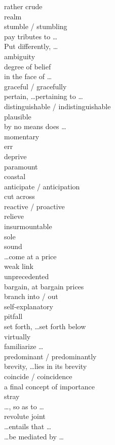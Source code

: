 \documentclass[12pt]{article}
\begin{document}
rather crude \\
realm \\
stumble / stumbling \\
pay tributes to \dots \\
Put differently, \dots \\
ambiguity \\
degree of belief \\
in the face of \dots \\
graceful / gracefully \\
pertain, \dots pertaining to \dots \\
distinguishable / indistinguishable \\
plausible \\
by no means does \dots \\
momentary \\
err \\
deprive \\
paramount \\
coastal \\
anticipate / anticipation \\
cut across \\
reactive / proactive \\
relieve \\
insurmountable \\
sole \\
sound \\
\dots come at a price \\
weak link \\
unprecedented \\
bargain, at bargain prices \\
branch into / out \\
self-explanatory \\
pitfall \\
set forth, \dots set forth below \\
virtually \\
familiarize \dots \\
predominant / predominantly \\
brevity, \dots lies in its brevity\\
coincide / coincidence \\
a final concept of importance \\
stray \\
\dots, so as to \dots \\
revolute joint \\
\dots entails that \dots \\
\dots be mediated by \dots \\
\end{document}
